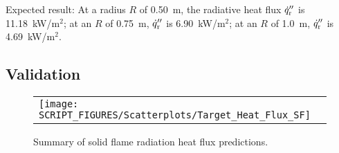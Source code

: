 \noindent Expected result: At a radius $R$ of 0.50~m, the radiative heat flux $\dot q''\sb{r}$ is 11.18~kW/m$^2$; at an $R$ of 0.75~m, $\dot q''\sb{r}$ is 6.90~kW/m$^2$; at an $R$ of 1.0~m, $\dot q''\sb{r}$ is 4.69~kW/m$^2$.

\subsection*{Validation}

\begin{figure}[!ht]
\begin{center}
\begin{tabular}{l}
\texttt{[image: SCRIPT\_FIGURES/Scatterplots/Target\_Heat\_Flux\_SF]}
\end{tabular}
\end{center}
\caption[Summary of solid flame radiation heat flux predictions]
{Summary of solid flame radiation heat flux predictions.}
\label{Heat_Flux_Solid_Flame_Summary}
\end{figure}

